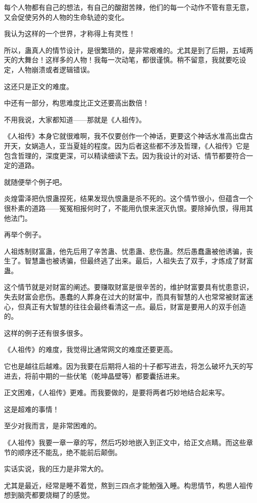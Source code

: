 \begin{this_body}
每个人物都有自己的想法，有自己的酸甜苦辣，他们的每一个动作不管有意无意，又会促使另外的人物的生命轨迹的变化。

我认为这样的一个世界，才称得上有灵性！

所以，蛊真人的情节设计，是很繁琐的，是非常艰难的。尤其是到了后期，五域两天的大舞台！这样多的人物！我每一次动笔，都很谨慎。稍不留意，我就要吃设定，人物崩溃或者逻辑错误。

这还只是正文的难度。

中还有一部分，构思难度比正文还要高出数倍！

不用我说，大家都知道——那就是《人祖传》。

《人祖传》本身它就很难啊，我不仅要创作一个神话，更要这个神话水准高出盘古开天，女娲造人，亚当夏娃的程度。因为后者这些都不涉及哲理，《人祖传》它是包含哲理的，深度更深，可以精读细读下去。因为我设计的对话、情节都要符合一定的道路。

就随便举个例子吧。

炎煌雷泽把仇恨蛊捏死，结果发现仇恨蛊是杀不死的。这个情节很小，但蕴含一个很朴素的道路——冤冤相报何时了，不能用仇恨来泯灭仇恨。要除掉仇恨，得用其他法门。

再举个例子。

人祖炼制财富蛊，他先后用了辛苦蛊、忧患蛊、悲伤蛊。然后愚蠢蛊被他诱骗，丧生了。智慧蛊也被诱骗，但最终逃了出来。最后，人祖失去了双手，才炼成了财富蛊。

这个情节就是对财富的阐述。要赚取财富是很辛苦的，维护财富要具有忧患意识，失去财富会悲伤。愚蠢的人葬身在过大的财富中，而具有智慧的人也常常被财富迷心，但真正有大智慧的往往会最终看清这一点。最后，财富是要用人的双手创造的。

这样的例子还有很多很多。

《人祖传》的难度，我觉得比通常网文的难度还要更高。

它也是越往后越难。因为我要在后期将人祖的十子都写进去，将怎么破坏九天的写进去，将前中期的一些伏笔（乾坤晶壁等）都要囊括进来。

正文困难，《人祖传》更难。而我要做的，是要将两者巧妙地结合起来写。

这是超难的事情！

至少对我而言，是非常困难的。

《人祖传》我要一章一章的写，然后巧妙地嵌入到正文中，给正文点睛。而这些章节的顺序还不能乱，绝不能前后颠倒。

实话实说，我的压力是非常大的。

尤其是最近，经常是睡不着觉，熬到三四点才能勉强入睡。构思情节，构思人祖传想到脑壳都要烧糊了的感觉。


\end{this_body}
